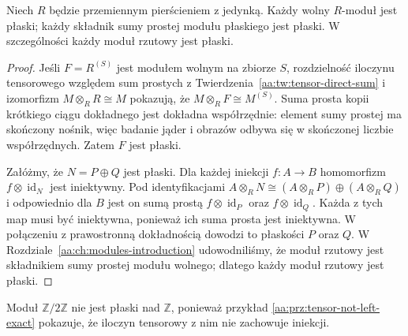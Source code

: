 \begin{twierdzenie}
\label{aa:tw:projective-flat}
Niech $R$ będzie przemiennym pierścieniem z jedynką.
Każdy wolny $R$-moduł jest płaski; każdy składnik sumy
prostej modułu płaskiego jest płaski. W szczególności
każdy moduł rzutowy jest płaski.
\end{twierdzenie}
\begin{proof}
Jeśli $F=R^{(S)}$ jest modułem wolnym na zbiorze $S$,
rozdzielność iloczynu tensorowego względem sum prostych
z Twierdzenia~\ref{aa:tw:tensor-direct-sum} i izomorfizm
$M\otimes_RR\cong M$ pokazują, że
$M\otimes_RF\cong M^{(S)}$.
Suma prosta kopii krótkiego ciągu dokładnego jest
dokładna współrzędnie: element sumy prostej ma skończony
nośnik, więc badanie jąder i obrazów odbywa się w skończonej
liczbie współrzędnych. Zatem $F$ jest płaski.

Załóżmy, że $N=P\oplus Q$ jest płaski. Dla każdej
iniekcji $f:A\to B$ homomorfizm
$f\otimes\operatorname{id}_N$ jest iniektywny.
Pod identyfikacjami
$A\otimes_RN\cong(A\otimes_RP)\oplus(A\otimes_RQ)$
i odpowiednio dla $B$ jest on sumą prostą
$f\otimes\operatorname{id}_P$ oraz
$f\otimes\operatorname{id}_Q$. Każda z tych map
musi być iniektywna, ponieważ ich suma prosta jest
iniektywna. W połączeniu z prawostronną dokładnością
dowodzi to płaskości $P$ oraz $Q$.
W Rozdziale~\ref{aa:ch:modules-introduction} udowodniliśmy,
że moduł rzutowy jest składnikiem sumy prostej modułu
wolnego; dlatego każdy moduł rzutowy jest płaski.
\end{proof}

\begin{przyklad}
Moduł $\mathbb Z/2\mathbb Z$ nie jest płaski nad
$\mathbb Z$, ponieważ przykład
\ref{aa:prz:tensor-not-left-exact} pokazuje,
że iloczyn tensorowy z nim nie zachowuje iniekcji.
\end{przyklad}

